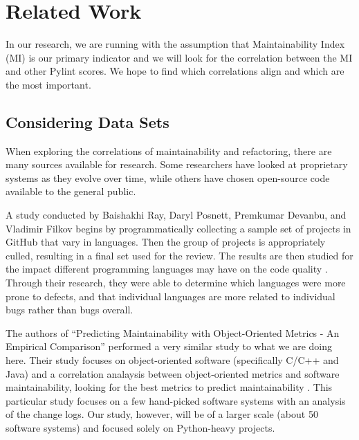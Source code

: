 
\section{Related Work} \label{sectionRelatedWork}

In our research, we are running with the assumption that Maintainability Index (MI) is our primary indicator and we will look for the correlation between the MI and other Pylint scores. We hope to find which correlations align and which are the most important.

\subsection{Considering Data Sets}

When exploring the correlations of maintainability and refactoring, there are many sources available for research. Some researchers have looked at proprietary systems as they evolve over time, while others have chosen open-source code available to the general public.

A study conducted by Baishakhi Ray, Daryl Posnett, Premkumar Devanbu, and Vladimir Filkov begins by programmatically collecting a sample set of projects in GitHub that vary in languages. Then the group of projects is appropriately culled, resulting in a final set used for the review. The results are then studied for the impact different programming languages may have on the code quality \cite{baishakhi:2017}. Through their research, they were able to determine which languages were more prone to defects, and that individual languages are more related to individual bugs rather than bugs overall.

The authors of ``Predicting Maintainability with Object-Oriented Metrics - An Empirical Comparison'' performed a very similar study to what we are doing here. Their study focuses on object-oriented software (specifically C/C++ and Java) and a correlation analaysis between object-oriented metrics and software maintainability, looking for the best metrics to predict maintainability \cite{janke:2003}. This particular study focuses on a few hand-picked software systems with an analysis of the change logs. Our study, however, will be of a larger scale (about 50 software systems) and focused solely on Python-heavy projects.

